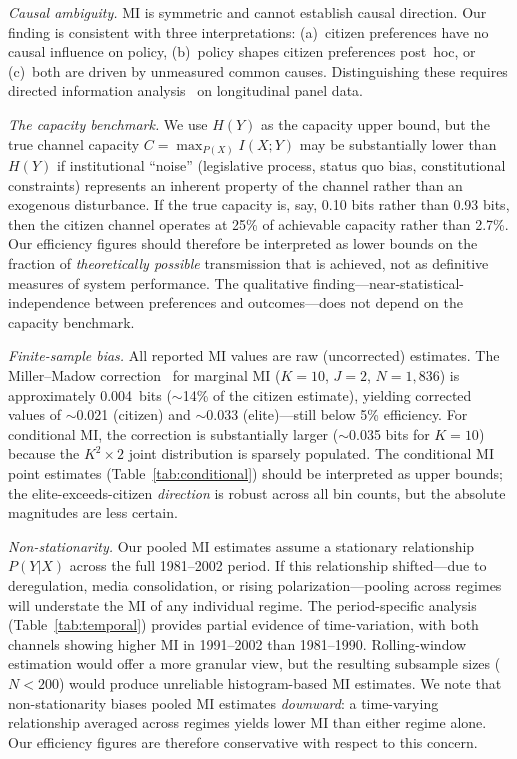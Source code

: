 \documentclass[twocolumn,10pt]{article}
\begin{document}
\emph{Causal ambiguity.}  MI is symmetric and cannot establish causal direction.  Our finding is consistent with three interpretations: (a)~citizen preferences have no causal influence on policy, (b)~policy shapes citizen preferences post~hoc, or (c)~both are driven by unmeasured common causes.  Distinguishing these requires directed information analysis~\citep{massey1990} on longitudinal panel data.

\emph{The capacity benchmark.}  We use $H(Y)$ as the capacity upper bound, but the true channel capacity $C = \max_{P(X)} I(X;Y)$ may be substantially lower than $H(Y)$ if institutional ``noise'' (legislative process, status quo bias, constitutional constraints) represents an inherent property of the channel rather than an exogenous disturbance.  If the true capacity is, say, 0.10 bits rather than 0.93 bits, then the citizen channel operates at 25\% of achievable capacity rather than 2.7\%.  Our efficiency figures should therefore be interpreted as lower bounds on the fraction of \emph{theoretically possible} transmission that is achieved, not as definitive measures of system performance.  The qualitative finding---near-statistical-independence between preferences and outcomes---does not depend on the capacity benchmark.

\emph{Finite-sample bias.}  All reported MI values are raw (uncorrected) estimates.  The Miller--Madow correction~\citep{miller1955} for marginal MI ($K{=}10$, $J{=}2$, $N{=}1{,}836$) is approximately 0.004~bits ($\sim$14\% of the citizen estimate), yielding corrected values of $\sim$0.021 (citizen) and $\sim$0.033 (elite)---still below 5\% efficiency.  For conditional MI, the correction is substantially larger ($\sim$0.035 bits for $K{=}10$) because the $K^2 \times 2$ joint distribution is sparsely populated.  The conditional MI point estimates (Table~\ref{tab:conditional}) should be interpreted as upper bounds; the elite-exceeds-citizen \emph{direction} is robust across all bin counts, but the absolute magnitudes are less certain.

\emph{Non-stationarity.}  Our pooled MI estimates assume a stationary relationship $P(Y|X)$ across the full 1981--2002 period.  If this relationship shifted---due to deregulation, media consolidation, or rising polarization---pooling across regimes will understate the MI of any individual regime.  The period-specific analysis (Table~\ref{tab:temporal}) provides partial evidence of time-variation, with both channels showing higher MI in 1991--2002 than 1981--1990.  Rolling-window estimation would offer a more granular view, but the resulting subsample sizes ($N < 200$) would produce unreliable histogram-based MI estimates.  We note that non-stationarity biases pooled MI estimates \emph{downward}: a time-varying relationship averaged across regimes yields lower MI than either regime alone.  Our efficiency figures are therefore conservative with respect to this concern.
\end{document}
